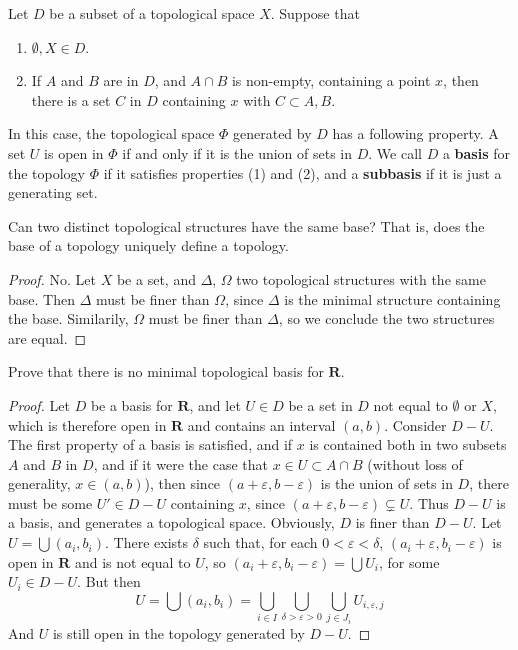 \begin{definition}
    Let $D$ be a subset of a topological space $X$. Suppose that
    \begin{enumerate}
        \item $\emptyset, X \in D$.
        \item If $A$ and $B$ are in $D$, and $A \cap B$ is non-empty, containing a point $x$, then there is a set $C$ in $D$ containing $x$ with $C \subset A, B$.
    \end{enumerate}
    In this case, the topological space $\Phi$ generated by $D$ has a following property. A set $U$ is open in $\Phi$ if and only if it is the union of sets in $D$. We call $D$ a {\bf basis} for the topology $\Phi$ if it satisfies properties (1) and (2), and a {\bf subbasis} if it is just a generating set.
\end{definition}

\begin{exercise}
    Can two distinct topological structures have the same base? That is, does the base of a topology uniquely define a topology.
\end{exercise}
\begin{proof}
    No. Let $X$ be a set, and $\Delta$, $\Omega$ two topological structures with the same base. Then $\Delta$ must be finer than $\Omega$, since $\Delta$ is the minimal structure containing the base. Similarily, $\Omega$ must be finer than $\Delta$, so we conclude the two structures are equal.
\end{proof}

\begin{exercise}
    Prove that there is no minimal topological basis for $\mathbf{R}$.
\end{exercise}
\begin{proof}
    Let $D$ be a basis for $\mathbf{R}$, and let $U \in D$ be a set in $D$ not equal to $\emptyset$ or $X$, which is therefore open in $\mathbf{R}$ and contains an interval $(a,b)$. Consider $D - U$. The first property of a basis is satisfied, and if $x$ is contained both in two subsets $A$ and $B$ in $D$, and if it were the case that $x \in U \subset A \cap B$ (without loss of generality, $x \in (a,b)$), then since $(a + \varepsilon,b - \varepsilon)$ is the union of sets in $D$, there must be some $U' \in D - U$ containing $x$, since $(a + \varepsilon, b - \varepsilon) \subsetneq U$. Thus $D - U$ is a basis, and generates a topological space. Obviously, $D$ is finer than $D -U$. Let $U = \bigcup (a_i, b_i)$. There exists $\delta$ such that, for each $0 < \varepsilon < \delta$, $(a_i + \varepsilon, b_i - \varepsilon)$ is open in $\mathbf{R}$ and is not equal to $U$, so $(a_i + \varepsilon, b_i - \varepsilon) = \bigcup U_i$, for some $U_i \in D - U$. But then
    \[ U = \bigcup (a_i, b_i) = \bigcup_{i \in I} \bigcup_{\delta > \varepsilon > 0} \bigcup_{j \in J_i} U_{i,\varepsilon,j} \]
    And $U$ is still open in the topology generated by $D - U$.
\end{proof}


